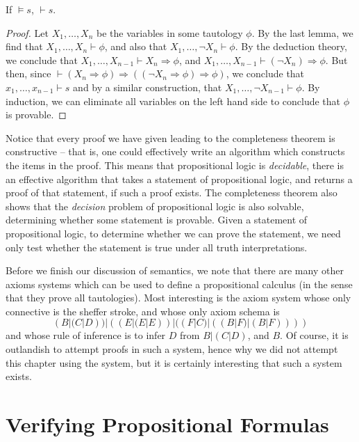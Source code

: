 \begin{corollary}
    If $\vDash s$, $\vdash s$.
\end{corollary}
\begin{proof}
    Let $X_1, \dots, X_n$ be the variables in some tautology $\phi$. By the last lemma, we find that $X_1, \dots, X_n \vdash \phi$, and also that $X_1, \dots, \neg X_n \vdash \phi$. By the deduction theory, we conclude that $X_1, \dots, X_{n-1} \vdash X_n \Rightarrow \phi$, and $X_1, \dots, X_{n-1} \vdash (\neg X_n) \Rightarrow \phi$. But then, since $\vdash (X_n \Rightarrow \phi) \Rightarrow ((\neg X_n \Rightarrow \phi) \Rightarrow \phi)$, we conclude that $x_1, \dots, x_{n-1} \vdash s$ and by a similar construction, that $X_1, \dots, \neg X_{n-1} \vdash \phi$. By induction, we can eliminate all variables on the left hand side to conclude that $\phi$ is provable.
\end{proof}

Notice that every proof we have given leading to the completeness theorem is constructive -- that is, one could effectively write an algorithm which constructs the items in the proof. This means that propositional logic is {\it decidable}, there is an effective algorithm that takes a statement of propositional logic, and returns a proof of that statement, if such a proof exists. The completeness theorem also shows that the {\it decision} problem of propositional logic is also solvable, determining whether some statement is provable. Given a statement of propositional logic, to determine whether we can prove the statement, we need only test whether the statement is true under all truth interpretations.

Before we finish our discussion of semantics, we note that there are many other axioms systems which can be used to define a propositional calculus (in the sense that they prove all tautologies). Most interesting is the axiom system whose only connective is the sheffer stroke, and whose only axiom schema is
%
\[ (B|(C|D))|((E|(E|E))|((F|C)|((B|F)|(B|F)))) \]
%
and whose rule of inference is to infer $D$ from $B|(C|D)$, and $B$. Of course, it is outlandish to attempt proofs in such a system, hence why we did not attempt this chapter using the system, but it is certainly interesting that such a system exists.

\section{Verifying Propositional Formulas}

